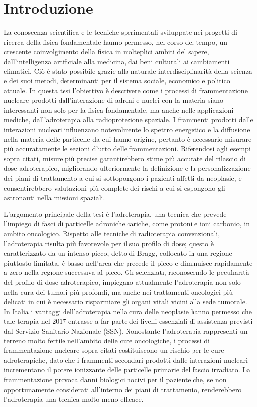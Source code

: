 \documentclass[12pt,a4paper,twoside]{report}
\begin{document}
	\chapter*{Introduzione}
	La conoscenza scientifica e le tecniche sperimentali sviluppate nei progetti di ricerca della fisica fondamentale hanno permesso, nel corso del tempo, un crescente coinvolgimento della fisica in molteplici ambiti del sapere, dall'intelligenza artificiale alla medicina, dai beni culturali ai cambiamenti climatici. Ciò è stato possibile grazie alla naturale interdisciplinarità della scienza e dei suoi metodi, determinanti per il sistema sociale, economico e politico attuale. In questa tesi l'obiettivo è descrivere come i processi di frammentazione nucleare prodotti dall'interazione di adroni e nuclei con la materia siano interessanti non solo per la fisica fondamentale, ma anche nelle applicazioni mediche, dall'adroterapia alla radioprotezione spaziale. I frammenti prodotti dalle interazioni nucleari influenzano notevolmente lo spettro energetico e la diffusione nella materia delle particelle da cui hanno origine, pertanto è necessario misurare più accuratamente le sezioni d'urto delle frammentazioni. Riferendosi agli esempi sopra citati, misure più precise garantirebbero stime più accurate del rilascio di dose adroterapico, migliorando ulteriormente la definizione e la personalizzazione dei piani di trattamento a cui si sottopongono i pazienti affetti da neoplasie, e consentirebbero valutazioni più complete dei rischi a cui si espongono gli astronauti nella missioni spaziali.
	
	L'argomento principale della tesi è l'adroterapia, una tecnica che prevede l'impiego di fasci di particelle adroniche cariche, come protoni e ioni carbonio, in ambito oncologico. Rispetto alle tecniche di radioterapia convenzionali, l'adroterapia risulta più favorevole per il suo profilo di dose; questo è caratterizzato da un intenso picco, detto di Bragg, collocato in una regione piuttosto limitata, è basso nell'area che precede il picco e diminuisce rapidamente a zero nella regione successiva al picco. Gli scienziati, riconoscendo le peculiarità del profilo di dose adroterapico, impiegano attualmente l'adroterapia non solo nella cura dei tumori più profondi, ma anche nei trattamenti oncologici più delicati in cui è necessario risparmiare gli organi vitali vicini alla sede tumorale. In Italia i vantaggi dell'adroterapia nella cura delle neoplasie hanno permesso che tale terapia nel $2017$ entrasse a far parte dei livelli essenziali di assistenza previsti dal Servizio Sanitario Nazionale (SSN). Nonostante l'adroterapia rappresenti un terreno molto fertile nell'ambito delle cure oncologiche, i processi di frammentazione nucleare sopra citati costituiscono un rischio per le cure adroterapiche, dato che i frammenti secondari prodotti dalle interazioni nucleari incrementano il potere ionizzante delle particelle primarie del fascio irradiato. La frammentazione provoca danni biologici nocivi per il paziente che, se non opportunamente considerati all'interno dei piani di trattamento, renderebbero l'adroterapia una tecnica molto meno efficace.
	
\end{document}
